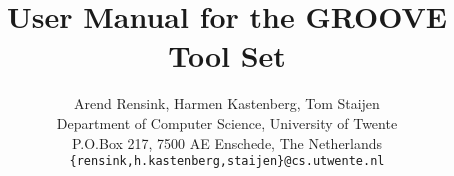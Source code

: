 \documentclass[11pt]{article}
\begin{document}
\title{User Manual for the GROOVE Tool Set}
\author{Arend Rensink, Harmen Kastenberg, Tom Staijen\\ Department of Computer Science, University of Twente
  \\ P.O.Box 217, 7500 AE Enschede, The Netherlands \\ \tt{\{rensink,h.kastenberg,staijen\}@cs.utwente.nl}}
\maketitle








\end{document}
